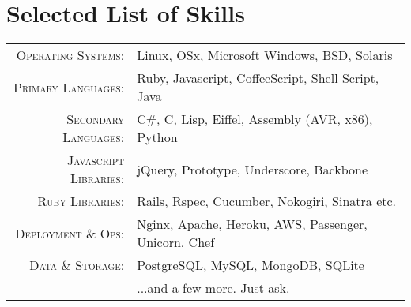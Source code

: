 \documentclass[a4paper,11pt]{article}
\begin{document}
\section{Selected List of Skills}
\begin{tabular}{rl}
  \textsc{Operating Systems:}& Linux, OSx, Microsoft Windows, BSD, Solaris\\
  \textsc{Primary Languages:}& Ruby, Javascript, CoffeeScript, Shell Script, Java\\
  \textsc{Secondary Languages:}& C\#, C, Lisp, Eiffel, Assembly (AVR, x86), Python\\
  \textsc{Javascript Libraries:} & jQuery, Prototype, Underscore, Backbone\\
  \textsc{Ruby Libraries:} & Rails, Rspec, Cucumber, Nokogiri, Sinatra etc.\\
  \textsc{Deployment \& Ops:} & Nginx, Apache, Heroku, AWS, Passenger, Unicorn, Chef\\
  \textsc{Data \& Storage:} & PostgreSQL, MySQL, MongoDB, SQLite\\
                   & ...and a few more. Just ask.
\end{tabular}
\end{document}
